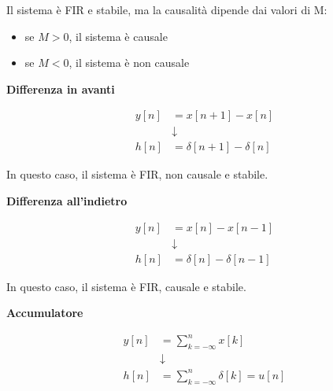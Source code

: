 Il sistema è FIR e stabile, ma la causalità dipende dai valori di M: 

\begin{itemize}
    \item se $M > 0$, il sistema è causale
    \item se $M < 0$, il sistema è non causale
\end{itemize}

\textbf{Differenza in avanti} \newline 

{
    \Large 
    \begin{equation}
        \begin{split}
            y \left[ n\right] &= x \left[ n + 1\right] - x \left[ n \right]
            \\
            &\downarrow
            \\
            h \left[ n \right] &= \delta \left[ n + 1\right] - \delta \left[ n \right]
        \end{split}
    \end{equation}
}

In questo caso, il sistema è FIR, non causale e stabile. \newline 

\textbf{Differenza all'indietro} \newline 

{
    \Large 
    \begin{equation}
        \begin{split}
            y \left[ n\right] &= x \left[ n\right] - x \left[ n - 1 \right]
            \\
            &\downarrow
            \\
            h \left[ n \right] &= \delta \left[ n \right] - \delta \left[ n - 1\right]
        \end{split}
    \end{equation}
}

In questo caso, il sistema è FIR, causale e stabile. \newline 

\newpage 

\textbf{Accumulatore} \newline 

{
    \Large 
    \begin{equation}
        \begin{split}
        y \left[ n\right]
        &= 
        \sum_{k = - \infty}^{n}
        x \left[ k\right]
       \\
       &\downarrow
       \\
       h \left[ n\right]
       &= 
        \sum_{k = - \infty}^{n} 
        \delta \left[ k\right]
        = 
        u \left[ n\right]
    \end{split}
    \end{equation}
}

